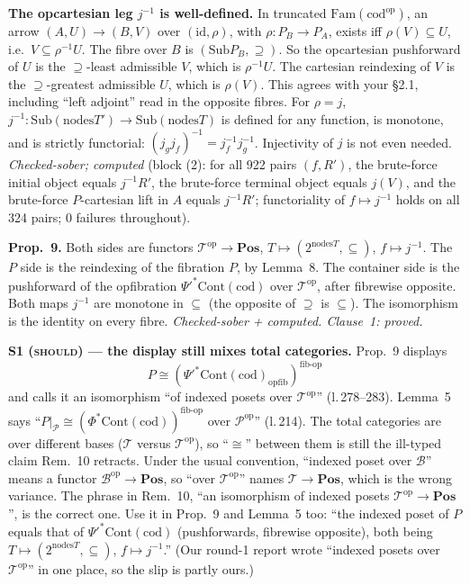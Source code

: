 \documentclass[11pt]{article}
\newcommand{\iss}[1]{\textsc{#1}}
\newcommand{\nodes}{\mathrm{nodes}}
\newcommand{\Sub}{\mathrm{Sub}}
\newcommand{\Cont}{\mathrm{Cont}}
\newcommand{\Pos}{\mathbf{Pos}}
\newcommand{\T}{\mathcal T}
\begin{document}
\textbf{The opcartesian leg $j^{-1}$ is well-defined.} In truncated $\mathrm{Fam}(\mathrm{cod}^{\mathrm{op}})$,
an arrow $(A,U)\to(B,V)$ over $(\mathrm{id},\rho)$, with $\rho\colon P_B\to P_A$, exists iff
$\rho(V)\subseteq U$, i.e.\ $V\subseteq\rho^{-1}U$. The fibre over $B$ is $(\Sub P_B,\supseteq)$.
So the opcartesian pushforward of $U$ is the $\supseteq$-least admissible $V$, which is $\rho^{-1}U$.
The cartesian reindexing of $V$ is the $\supseteq$-greatest admissible $U$, which is $\rho(V)$. This
agrees with your \S2.1, including ``left adjoint'' read in the opposite fibres. For $\rho=j$,
$j^{-1}\colon\Sub(\nodes T')\to\Sub(\nodes T)$ is defined for any function, is monotone, and is
strictly functorial: $(j_gj_f)^{-1}=j_f^{-1}j_g^{-1}$. Injectivity of $j$ is not even needed.
\emph{Checked-sober; computed} (block (2): for all 922 pairs $(f,R')$, the brute-force initial object
equals $j^{-1}R'$, the brute-force terminal object equals $j(V)$, and the brute-force $P$-cartesian
lift in $A$ equals $j^{-1}R'$; functoriality of $f\mapsto j^{-1}$ holds on all 324 pairs; 0 failures
throughout).

\textbf{Prop.~9.} Both sides are functors $\T^{\mathrm{op}}\to\Pos$, $T\mapsto(2^{\nodes T},\subseteq)$,
$f\mapsto j^{-1}$. The $P$ side is the reindexing of the fibration $P$, by Lemma~8. The container
side is the pushforward of the opfibration $\Psi'^{*}\Cont(\mathrm{cod})$ over $\T^{\mathrm{op}}$,
after fibrewise opposite. Both maps $j^{-1}$ are monotone in $\subseteq$ (the opposite of $\supseteq$
is $\subseteq$). The isomorphism is the identity on every fibre. \emph{Checked-sober + computed.
Clause~1: proved.}

\textbf{S1 (\iss{should}) --- the display still mixes total categories.} Prop.~9 displays
\[P\cong(\Psi'^{*}\Cont(\mathrm{cod})_{\mathrm{opfib}})^{\mathrm{fib\text{-}op}}\] and calls it an
isomorphism ``of indexed posets over $\T^{\mathrm{op}}$'' (l.\,278--283). Lemma~5 says ``$P|_{\mathcal P}
\cong(\Phi^{*}\Cont(\mathrm{cod}))^{\mathrm{fib\text{-}op}}$ over $\mathcal P^{\mathrm{op}}$'' (l.\,214).
The total categories are over different bases ($\T$ versus $\T^{\mathrm{op}}$), so ``$\cong$''
between them is still the ill-typed claim Rem.~10 retracts. Under the usual convention, ``indexed
poset over $\mathcal B$'' means a functor $\mathcal B^{\mathrm{op}}\to\Pos$, so ``over $\T^{\mathrm{op}}$''
names $\T\to\Pos$, which is the wrong variance. The phrase in Rem.~10, ``an isomorphism of indexed
posets $\T^{\mathrm{op}}\to\Pos$'', is the correct one. Use it in Prop.~9 and Lemma~5 too: ``the
indexed poset of $P$ equals that of $\Psi'^{*}\Cont(\mathrm{cod})$ (pushforwards, fibrewise
opposite), both being $T\mapsto(2^{\nodes T},\subseteq)$, $f\mapsto j^{-1}$.''
(Our round-1 report wrote ``indexed posets over $\T^{\mathrm{op}}$'' in one place, so the slip is
partly ours.)
\end{document}
